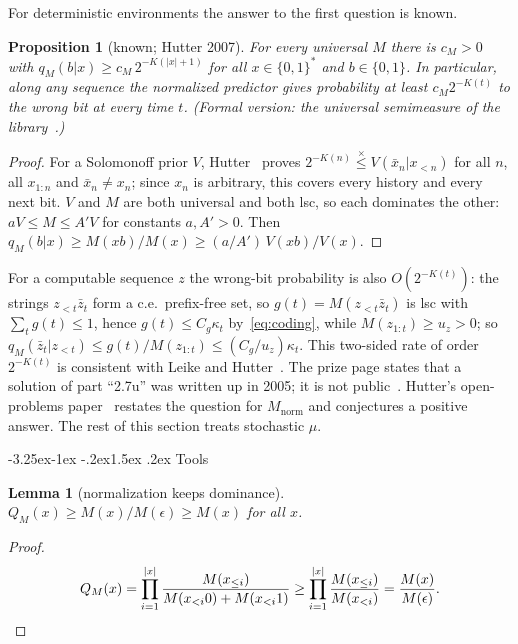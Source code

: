 \documentclass[11pt]{article}
\makeatletter
\renewcommand\subsection{\@startsection{subsection}{2}{\z@}%
  {-3.25ex\@plus -1ex \@minus -.2ex}{1.5ex \@plus .2ex}%
  {\normalfont\large\bfseries\boldmath}}
\newcommand{\B}{\{0,1\}}
\newcommand{\Bs}{\{0,1\}^*}
\newcommand{\eps}{\epsilon}
\newcommand{\Mnorm}{M_{\mathrm{norm}}}
\newcommand{\leqx}{\mathrel{\stackrel{\times}{\leq}}}
\newtheorem{lemma}[theorem]{Lemma}
\newtheorem{proposition}[theorem]{Proposition}
\theoremstyle{definition}
\theoremstyle{remark}
\makeatother
\begin{document}
For deterministic environments the answer to the first question is known.

\begin{proposition}[known; Hutter 2007]\label{prop:27F}
For every universal $M$ there is $c_M>0$ with $q_M(b|x)\ge c_M\,2^{-K(|x|+1)}$
for all $x\in\Bs$ and $b\in\B$. In particular, along any sequence the
normalized predictor gives probability at least $c_M2^{-K(t)}$ to the wrong
bit at every time $t$. (Formal version: the universal semimeasure of the
library~\cite{milovanovlean}.)
\end{proposition}

\begin{proof}
For a Solomonoff prior $V$, Hutter~\cite[eq.~(17)]{hutter2007bayesconf} proves
$2^{-K(n)}\leqx V(\bar x_n|x_{<n})$ for all $n$, all $x_{1:n}$ and
$\bar x_n\neq x_n$; since $x_n$ is arbitrary, this covers every history and
every next bit. $V$ and $M$ are both universal and both lsc, so each
dominates the other: $aV\le M\le A'V$ for constants $a,A'>0$. Then
$q_M(b|x)\ge M(xb)/M(x)\ge(a/A')\,V(xb)/V(x)$.
\end{proof}

For a computable sequence $z$ the wrong-bit probability is also
$O(2^{-K(t)})$: the strings $z_{<t}\bar z_t$ form a c.e.\ prefix-free set, so
$g(t)=M(z_{<t}\bar z_t)$ is lsc with $\sum_tg(t)\le1$, hence $g(t)\le C_g\kappa_t$
by~\eqref{eq:coding}, while $M(z_{1:t})\ge u_z>0$; so
$q_M(\bar z_t|z_{<t})\le g(t)/M(z_{1:t})\le(C_g/u_z)\kappa_t$. This two-sided rate of
order $2^{-K(t)}$ is consistent with Leike and Hutter~\cite{leikehutter2015nicod}.
The prize page states that a solution of part ``2.7u'' was written up in 2005;
it is not public~\cite{hutterprizepage}. Hutter's open-problems
paper~\cite{hutter2009open} restates the question for $\Mnorm$ and conjectures
a positive answer. The rest of this section treats stochastic $\mu$.

\subsection{Tools}

\begin{lemma}[normalization keeps dominance]\label{lem:normdom}
$Q_M(x)\ge M(x)/M(\eps)\ge M(x)$ for all $x$.
\end{lemma}

\begin{proof}
\[
Q_M(x)=\prod_{i=1}^{|x|}\frac{M(x_{\le i})}{M(x_{<i}0)+M(x_{<i}1)}
\ge\prod_{i=1}^{|x|}\frac{M(x_{\le i})}{M(x_{<i})}=\frac{M(x)}{M(\eps)}.
\qedhere
\]
\end{proof}
\end{document}
